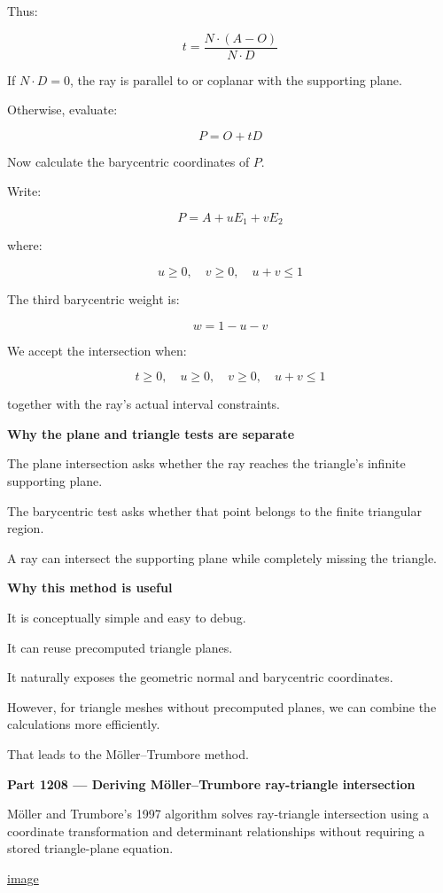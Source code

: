 Thus:

\[
\boxed{ t=\frac{N\cdot(A-O)}{N\cdot D} }
\]

If \(N\cdot D=0\), the ray is parallel to or coplanar with the supporting plane.

Otherwise, evaluate:

\[
P=O+tD
\]

Now calculate the barycentric coordinates of \(P\).

Write:

\[
P=A+uE_1+vE_2
\]

where:

\[
u\ge0,\quad v\ge0,\quad u+v\le1
\]

The third barycentric weight is:

\[
w=1-u-v
\]

We accept the intersection when:

\[
\boxed{ t\ge0,\quad u\ge0,\quad v\ge0,\quad u+v\le1 }
\]

together with the ray's actual interval constraints.

\textbf{Why the plane and triangle tests are separate}

The plane intersection asks whether the ray reaches the triangle's infinite supporting plane.

The barycentric test asks whether that point belongs to the finite triangular region.

A ray can intersect the supporting plane while completely missing the triangle.

\textbf{Why this method is useful}

It is conceptually simple and easy to debug.

It can reuse precomputed triangle planes.

It naturally exposes the geometric normal and barycentric coordinates.

However, for triangle meshes without precomputed planes, we can combine the calculations more efficiently.

That leads to the Möller--Trumbore method.

\textbf{Part 1208 --- Deriving Möller--Trumbore ray-triangle intersection}

Möller and Trumbore's 1997 algorithm solves ray-triangle intersection using a coordinate transformation and determinant relationships without requiring a stored triangle-plane equation. 

\href{https://www.google.com/s2/favicons?domain=https://www.tandfonline.com&sz=32}{image}

